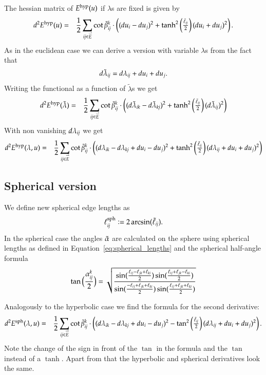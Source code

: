 \documentclass[Thesis]{subfiles}
\begin{document}
The hessian matrix of $E^{\rm hyp}(u)$ if $\lambda$s are fixed is given by
\begin{eqnarray*}
d^2E^{\rm hyp}(u)
&=&\frac{1}{2}\sum_{\it ij\in \accentset{\rightharpoonup}{E}} \cot\tilde{\beta}^k_{\it ij} \cdot \left((du_i-du_j)^2+
\tanh^2\left(\tfrac{\tilde \ell_{\it ij}}{2}\right)(du_i+du_j)^2\right).
\end{eqnarray*}
 As in the euclidean case we can derive a version with variable $\lambda$s from the fact that 
\begin{equation*}
d\tilde \lambda_{\it ij}=d\lambda_{\it ij}+du_i+du_j.
\end{equation*}
Writing the functional as a function of $\tilde \lambda$s we get 
\begin{eqnarray*}
 d^2E^{\rm hyp}(\tilde \lambda) &=&
 \frac{1}{2}\sum_{\it ij\in \accentset{\rightharpoonup}{E}} \cot\tilde{\beta}^k_{\it ij} \cdot \left((d\tilde\lambda_{\it ik}-d\tilde\lambda_{\it kj})^2+\tanh^2\left(\tfrac{\tilde \ell_{\it ij}}{2}\right)(d\tilde\lambda_{\it ij})^2\right)
\end{eqnarray*}
With non vanishing $d\lambda_{\it ij}$ we get
\begin{eqnarray*}
d^2E^{\rm hyp}(\lambda, u)
&=& \frac{1}{2}\sum_{\it ij\in \accentset{\rightharpoonup}{E}} \cot\tilde{\beta}^k_{\it ij} \cdot 
 \left((d\lambda_{\it ik}-d\lambda_{\it kj} +  du_i-du_j)^2+\tanh^2\left(\tfrac{\tilde \ell_{\it ij}}{2}\right)(d\lambda_{\it ij} +du_i+du_j)^2\right)
\end{eqnarray*}

\subsection{Spherical version}
\label{sec:spherical_fuctional}
We define new spherical edge lengths as 
\begin{equation}
\ell^{\rm sph}_{\it ij} \vcentcolon= 2\arcsin(\tilde \ell_{\it ij}).\label{eq:spherical_lengths}
\end{equation}
In the spherical case the angles $\tilde{\alpha}$ are calculated on the sphere using spherical lengths as defined in 
Equation~\ref{eq:spherical_lengths} and the spherical half-angle formula
\[
  \tan\Big(\frac{\alpha^k_{\it ij}}{2}\Big)=
  \sqrt{\frac{
      \sin(\frac{\ell_{ij}-\ell_{jk}+\ell_{ki}}{2})
      \sin(\frac{\ell_{ij}+\ell_{jk}-\ell_{ki}}{2})
    }{
      \sin(\frac{-\ell_{ij}+\ell_{jk}+\ell_{ki}}{2})
      \sin(\frac{\ell_{ij}+\ell_{jk}+\ell_{ki}}{2})
    }}
\]

Analogously to the hyperbolic case we find the formula for the second derivative:
\begin{eqnarray*}
d^2E^{\rm sph}(\lambda, u)
&=& \frac{1}{2}\sum_{\it ij\in \accentset{\rightharpoonup}{E}} \cot\tilde{\beta}^k_{\it ij} \cdot 
 \left((d\lambda_{\it ik}-d\lambda_{\it kj} +  du_i-du_j)^2-\tan^2\left(\tfrac{\tilde \ell_{\it ij}}{2}\right)(d\lambda_{\it ij} +du_i+du_j)^2\right).
\end{eqnarray*}
Note the change of the sign in front of the $\tan$ in the formula and the $\tan$ instead of a $\tanh$. 
Apart from that the hyperbolic and spherical derivatives look the same.
\end{document}
